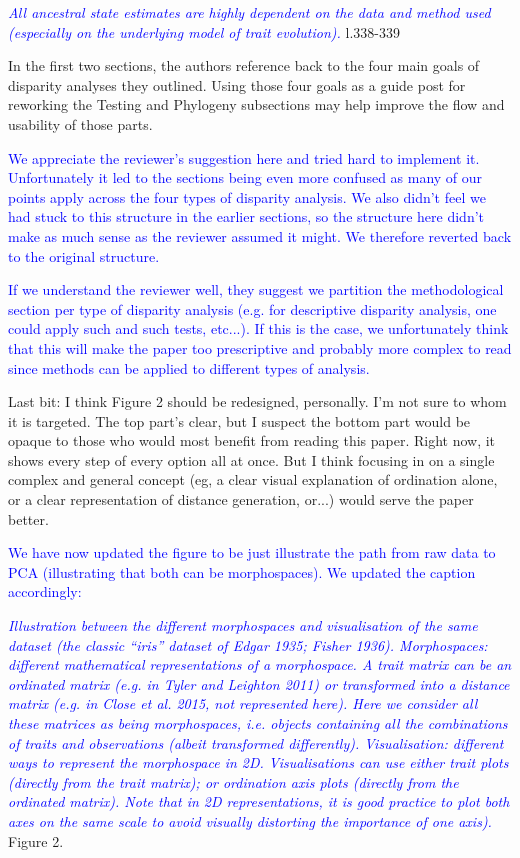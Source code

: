 \documentclass[12pt,letterpaper]{article}
\begin{document}
\textcolor{blue}{\textit{All ancestral state estimates are highly dependent on the data and method used (especially on the underlying model of trait evolution).}} l.338-339 %

\noindent In the first two sections, the authors reference back to the four main goals of disparity analyses they outlined. Using those four goals as a guide post for reworking the Testing and Phylogeny subsections may help improve the flow and usability of those parts.

\textcolor{blue}{We appreciate the reviewer's suggestion here and tried hard to implement it. Unfortunately it led to the sections being even more confused as many of our points apply across the four types of disparity analysis. We also didn't feel we had stuck to this structure in the earlier sections, so the structure here didn't make as much sense as the reviewer assumed it might. We therefore reverted back to the original structure.}

\textcolor{blue}{If we understand the reviewer well, they suggest we partition the methodological section per type of disparity analysis (e.g. for descriptive disparity analysis, one could apply such and such tests, etc...). If this is the case, we unfortunately think that this will make the paper too prescriptive and probably more complex to read since methods can be applied to different types of analysis.}

\noindent Last bit: I think Figure 2 should be redesigned, personally. I'm not sure to whom it is targeted. The top part's clear, but I suspect the bottom part would be opaque to those who would most benefit from reading this paper. Right now, it shows every step of every option all at once. But I think focusing in on a single complex and general concept (eg, a clear visual explanation of ordination alone, or a clear representation of distance generation, or...) would serve the paper better. 

\textcolor{blue}{We have now updated the figure to be just illustrate the path from raw data to PCA (illustrating that both can be morphospaces). We updated the caption accordingly:}

\textcolor{blue}{\textit{Illustration between the different morphospaces and visualisation of the same dataset (the classic ``iris'' dataset of Edgar 1935; Fisher 1936).
Morphospaces: different mathematical representations of a morphospace. A trait matrix can be an ordinated matrix (e.g. in Tyler and Leighton 2011) or transformed into a distance matrix (e.g. in Close et al. 2015, not represented here).
Here we consider all these matrices as being \textit{morphospaces}, i.e. objects containing all the combinations of traits and observations (albeit transformed differently).
Visualisation: different  ways to represent the morphospace in 2D.
Visualisations can use either trait plots (directly from the trait matrix); or ordination axis plots (directly from the ordinated matrix).
Note that in 2D representations, it is good practice to plot both axes on the same scale to avoid visually distorting the importance of one axis).}} Figure 2. %
\end{document}
